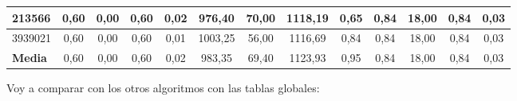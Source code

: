 \documentclass[12pt, spanish]{article}
\begin{document}
\begin{table}[H]
\begin{adjustwidth}{-1cm}{-1cm}
\begin{tabular}{|l|c|c|c|c|c|c|c|c|c|c|c|c|}
213566                                                  & 0,60                         & 0,00                           & 0,60                      & 0,02                   & 976,40                       & 70,00                          & 1118,19                   & 0,65                   & 0,84                         & 18,00                          & 0,84                      & 0,03                   \\ \hline
3939021                                                 & 0,60                         & 0,00                           & 0,60                      & 0,01                   & 1003,25                      & 56,00                          & 1116,69                   & 0,84                   & 0,84                         & 18,00                          & 0,84                      & 0,03                   \\ \hline
\textbf{Media}                                          & 0,60                         & 0,00                           & 0,60                      & 0,02                   & 983,35                       & 69,40                          & 1123,93                   & 0,95                   & 0,84                         & 18,00                          & 0,84                      & 0,03                   \\ \hline
\end{tabular}

\end{adjustwidth}

\end{table}

\newpage
Voy a comparar con los otros algoritmos con las tablas globales:
\end{document}
